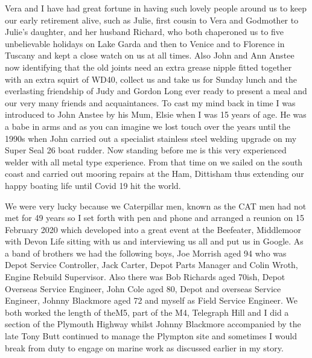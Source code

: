 Vera and I have had great fortune in having such lovely people around us to keep
our early retirement alive, such as Julie, first cousin to Vera and Godmother
to Julie's daughter, and her husband Richard, who both chaperoned us to five
unbelievable holidays on Lake Garda and then to Venice and to Florence in
Tuscany and kept a close watch on us at all times. Also John and Ann Anstee now
identifying that the old joints need an extra grease nipple fitted together
with an extra squirt of WD40, collect us and take us for Sunday lunch and the
everlasting friendship of Judy and Gordon Long ever ready to present a meal and
our very many friends and acquaintances. To cast my mind back in time I was
introduced to John Anstee by his Mum, Elsie when I was 15 years of age. He was
a babe in arms and as you can imagine we lost touch over the years until the
1990s when John carried out a specialist stainless steel welding upgrade on my
Super Seal 26 boat rudder. Now standing before me is this very experienced
welder with all metal type experience. From that time on we sailed on the south
coast and carried out mooring repairs at the Ham, Dittisham thus extending our
happy boating life until Covid 19 hit the world.

We were very lucky because we Caterpillar men, known as the CAT men had not met
for 49 years so I set forth with pen and phone and arranged a reunion on 15
February 2020 which developed into a great event at the Beefeater, Middlemoor
with Devon Life sitting with us and interviewing us all and put us in Google.
As a band of brothers we had the following boys, Joe Morrish aged 94 who was
Depot Service Controller, Jack Carter, Depot Parts Manager and Colin Wroth,
Engine Rebuild Supervisor. Also there was Bob Richards aged 70ish, Depot
Overseas Service Engineer, John Cole aged 80, Depot and overseas Service
Engineer, Johnny Blackmore aged 72 and myself as Field Service Engineer. We
both worked the length of theM5, part of the M4, Telegraph Hill and I did a
section of the Plymouth Highway whilst Johnny Blackmore accompanied by the late
Tony Butt continued to manage the Plympton site and sometimes I would break
from duty to engage on marine work as discussed earlier in my story.

